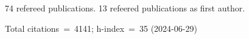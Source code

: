 74 refereed publications. 13 refeered publications as first author.

Total citations~=~4141; h-index~=~35 (2024-06-29)